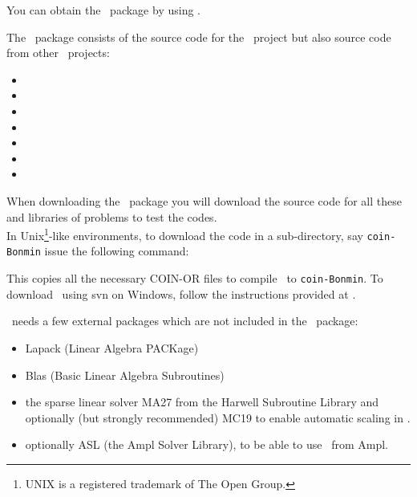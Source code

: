 \StartPageSummary
{}
\EndPageSummary
\NavigationPanel





You can obtain the \Bonmin\ package by using
.

The \Bonmin\ package consists of the source code for the \Bonmin\
project but also source code from other \COINOR\ projects:
\begin{itemize}
\item \BuildTools
\item \Cbc
\item \Cgl
\item \Clp
\item \CoinUtils
\item \Ipopt
\item \Osi
\end{itemize}

When downloading the \Bonmin\ package you will download the source code for all these and
libraries of problems to test the codes.\\

In Unix\footnote{UNIX is a registered trademark of The Open
Group.}-like environments, to download the code in a sub-directory, say {\tt coin-Bonmin} issue the following
command:
\break


\noindent This copies all the necessary COIN-OR files to compile \Bonmin\ to
{\tt coin-Bonmin}. To download \Bonmin\ using svn on Windows,
follow the instructions provided at
.

\Bonmin\ needs a few external packages which are not included in the \Bonmin\ package:
\begin{itemize}
\item Lapack (Linear Algebra PACKage)
\item Blas (Basic Linear Algebra Subroutines)
\item the sparse linear solver MA27 from the Harwell Subroutine Library and optionally (but strongly recommended) MC19 to enable automatic scaling in \Ipopt.
\item optionally ASL (the Ampl Solver Library), to be able to use \Bonmin\ from Ampl.
\end{itemize}

